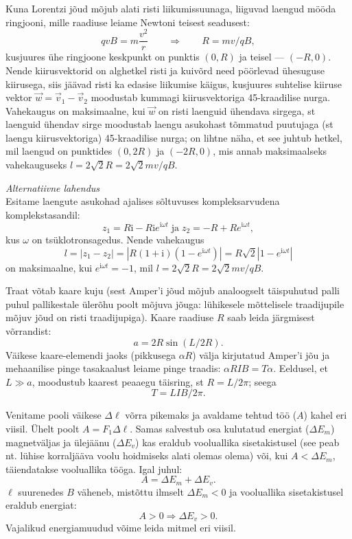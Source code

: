 \documentclass[10pt]{article}
\begin{document}
{
\solu
Kuna Lorentzi jõud mõjub alati risti liikumissuunaga, liiguvad laengud mööda ringjooni, mille raadiuse leiame Newtoni teisest seadusest:
\[
qvB=m\frac{v^2}{r} \qquad \Rightarrow \qquad R=mv/qB,
\]
kusjuures ühe ringjoone keskpunkt on punktis $(0,R)$ ja teisel --- $(-R,0)$.
Nende kiirusvektorid on alghetkel risti ja kuivõrd need pöörlevad ühesuguse kiirusega, siis jäävad risti ka edasise liikumise käigus,
kusjuures suhtelise kiiruse vektor $\vec w= \vec v_1-\vec v_2$ moodustab kummagi kiirusvektoriga 45-kraadilise nurga. Vahekaugus on
maksimaalne, kui $\vec w$ on risti laenguid ühendava sirgega, st laenguid ühendav sirge moodustab laengu asukohast tõmmatud
puutujaga (st laengu kiirusvektoriga) 45-kraadilise nurga; on lihtne näha, et see juhtub hetkel, mil laengud on punktides $(0,2R)$ ja $(-2R,0)$, mis
annab maksimaalseks vahekauguseks $l=2\sqrt 2 R =2\sqrt 2mv/qB$.

\vspace{0.5\baselineskip}

{\em Alternatiivne lahendus}\\
Esitame laengute asukohad ajalises sõltuvuses kompleksarvudena komplekstasandil:
$$z_1=R\mathrm{i} - R\mathrm{i}e^{\mathrm{i}\omega t}\;\mbox{ja}\; z_2= -R + Re^{\mathrm{i}\omega t},$$ kus
$\omega$ on tsüklotronsagedus. Nende vahekaugus
$$l=|z_1-z_2|=|R(1+\mathrm{i})(1-e^{\mathrm{i}\omega t})|=R\sqrt 2|1-e^{\mathrm{i}\omega t}|$$ on maksimaalne, kui $e^{\mathrm{i}\omega t}=-1$, mil $l=2\sqrt{2}R=2\sqrt{2}mv/qB$.
\probend
\bigskip


\solu
Traat võtab kaare kuju (sest Amper’i jõud mõjub analoogselt täispuhutud palli puhul pallikestale ülerõhu poolt mõjuva jõuga: lühikesele mõttelisele traadijupile mõjuv jõud on risti traadijupiga). Kaare raadiuse $R$ saab leida järgmisest võrrandist:
\[
a = 2R \sin (L/2R).
\]
Väikese kaare-elemendi jaoks (pikkusega $\alpha R$) välja kirjutatud Amper’i jõu ja mehaanilise pinge tasakaalust leiame pinge traadis: $\alpha RIB = T \alpha$. Eeldusel, et $L \gg a$, moodustub kaarest peaaegu täisring, st $R = L/2\pi$; seega
\[
T = LIB/2\pi.
\]
\probend
\bigskip


\solu
Venitame pooli väikese $\Delta \ell$ võrra pikemaks ja avaldame tehtud töö ($A$) kahel eri viisil. Ühelt poolt $A = F_1\Delta \ell$. Samas salvestub osa kulutatud energiat ($\Delta E_m$) magnetväljas ja ülejäänu ($\Delta E_v$) kas eraldub vooluallika sisetakistusel (see peab nt. lühise korraljääva voolu hoidmiseks alati olemas olema) või, kui $A < \Delta E_m$, täiendatakse vooluallika tööga. Igal juhul:
\[
A = \Delta E_m + \Delta E_v.
\]
$\ell$ suurenedes $B$ väheneb, mistõttu ilmselt $\Delta E_m < 0$ ja vooluallika sisetakistusel eraldub energiat:
\[
A > 0 \Longrightarrow \Delta E_v > 0.
\]
Vajalikud energiamuudud võime leida mitmel eri viisil.

}
\end{document}
